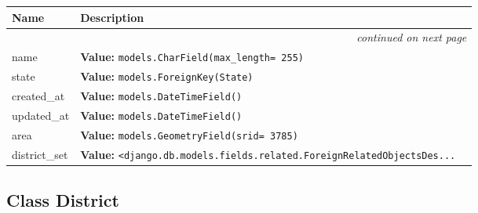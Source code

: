     \vspace{-1cm}
\hspace{\varindent}\begin{longtable}{|p{\varnamewidth}|p{\vardescrwidth}|l}
\cline{1-2}
\cline{1-2} \centering \textbf{Name} & \centering \textbf{Description}& \\
\cline{1-2}
\endhead\cline{1-2}\multicolumn{3}{r}{\small\textit{continued on next page}}\\\endfoot\cline{1-2}
\endlastfoot\raggedright n\-a\-m\-e\- & \raggedright \textbf{Value:} 
{\tt models.CharField(max\_length= 255)}&\\
\cline{1-2}
\raggedright s\-t\-a\-t\-e\- & \raggedright \textbf{Value:} 
{\tt models.ForeignKey(State)}&\\
\cline{1-2}
\raggedright c\-r\-e\-a\-t\-e\-d\-\_\-a\-t\- & \raggedright \textbf{Value:} 
{\tt models.DateTimeField()}&\\
\cline{1-2}
\raggedright u\-p\-d\-a\-t\-e\-d\-\_\-a\-t\- & \raggedright \textbf{Value:} 
{\tt models.DateTimeField()}&\\
\cline{1-2}
\raggedright a\-r\-e\-a\- & \raggedright \textbf{Value:} 
{\tt models.GeometryField(srid= 3785)}&\\
\cline{1-2}
\raggedright d\-i\-s\-t\-r\-i\-c\-t\-\_\-s\-e\-t\- & \raggedright \textbf{Value:} 
{\tt {\textless}django.db.models.fields.related.ForeignRelatedObjectsDes\texttt{...}}&\\
\cline{1-2}
\end{longtable}



\subsection{Class District}

